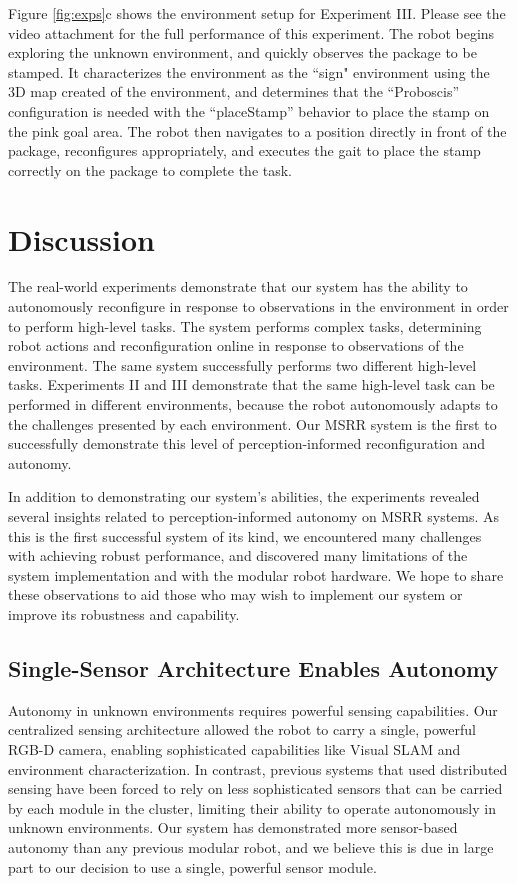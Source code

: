 \documentclass[conference]{IEEEtran}
\begin{document}
Figure \ref{fig:exps}c shows the environment setup for Experiment III. Please see the video attachment for the full performance of this experiment. The robot begins exploring the unknown environment, and quickly observes the package to be stamped. It characterizes the environment as the ``sign" environment using the 3D map created of the environment, and determines that the ``Proboscis'' configuration is needed with the ``placeStamp'' behavior to place the stamp on the pink goal area. The robot then navigates to a position directly in front of the package, reconfigures appropriately, and executes the gait to place the stamp correctly on the package to complete the task.

\section{Discussion}
\label{sec:discussion}
The real-world experiments demonstrate that our system has the ability to autonomously reconfigure in response to observations in the environment in order to perform high-level tasks. The system performs complex tasks, determining robot actions and reconfiguration online in response to observations of the environment. The same system successfully performs two different high-level tasks. Experiments II and III demonstrate that the same high-level task can be performed in different environments, because the robot autonomously adapts to the challenges presented by each environment. Our MSRR system is the first to successfully demonstrate this level of perception-informed reconfiguration and autonomy.

In addition to demonstrating our system's abilities, the experiments revealed several insights related to perception-informed autonomy on MSRR systems. As this is the first successful system of its kind, we encountered many challenges with achieving robust performance, and discovered many limitations of the system implementation and with the modular robot hardware. We hope to share these observations to aid those who may wish to implement our system or improve its robustness and capability.
%
\subsection{Single-Sensor Architecture Enables Autonomy}
%
Autonomy in unknown environments requires powerful sensing capabilities.  Our centralized sensing architecture allowed the robot to carry a single, powerful RGB-D camera, enabling sophisticated capabilities like Visual SLAM and environment characterization. In contrast, previous systems that used distributed sensing have been forced to rely on less sophisticated sensors that can be carried by each module in the cluster, limiting their ability to operate autonomously in unknown environments.   Our system has demonstrated more sensor-based autonomy than any previous modular robot, and we believe this is due in large part to our decision to use a single, powerful sensor module.
\end{document}
